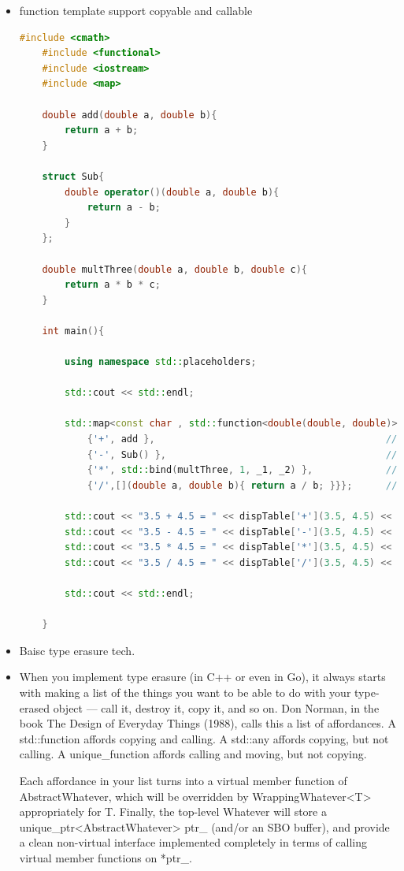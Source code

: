 \documentclass[a4paper,12pt,twoside]{book}
\begin{document}
\begin{itemize}
	\item function template support copyable and callable 
	\begin{lstlisting}[frame=single, language=c++]
	#include <cmath>
	#include <functional>
	#include <iostream>
	#include <map>
	
	double add(double a, double b){
		return a + b;
	}
	
	struct Sub{
		double operator()(double a, double b){
			return a - b;
		}
	};
	
	double multThree(double a, double b, double c){
		return a * b * c;
	}
	
	int main(){
		
		using namespace std::placeholders;
		
		std::cout << std::endl;
		
		std::map<const char , std::function<double(double, double)>> dispTable{  // (1)
			{'+', add },                                         // (2)
			{'-', Sub() },                                       // (3)
			{'*', std::bind(multThree, 1, _1, _2) },             // (4)
			{'/',[](double a, double b){ return a / b; }}};      // (5)
		
		std::cout << "3.5 + 4.5 = " << dispTable['+'](3.5, 4.5) << std::endl;
		std::cout << "3.5 - 4.5 = " << dispTable['-'](3.5, 4.5) << std::endl;
		std::cout << "3.5 * 4.5 = " << dispTable['*'](3.5, 4.5) << std::endl;
		std::cout << "3.5 / 4.5 = " << dispTable['/'](3.5, 4.5) << std::endl;
		
		std::cout << std::endl;
		
	}
	\end{lstlisting}
	
	\item Baisc type erasure tech.
	\item When you implement type erasure (in C++ or even in Go), it always starts with making a list of the things you want to be able to do with your type-erased object — call it, destroy it, copy it, and so on. Don Norman, in the book The Design of Everyday Things (1988), calls this a list of affordances. A std::function affords copying and calling. A std::any affords copying, but not calling. A unique_function affords calling and moving, but not copying.
	
	Each affordance in your list turns into a virtual member function of AbstractWhatever, which will be overridden by WrappingWhatever<T> appropriately for T. Finally, the top-level Whatever will store a unique_ptr<AbstractWhatever> ptr\_ (and/or an SBO buffer), and provide a clean non-virtual interface implemented completely in terms of calling virtual member functions on *ptr\_.
	

\end{itemize}
\end{document}
